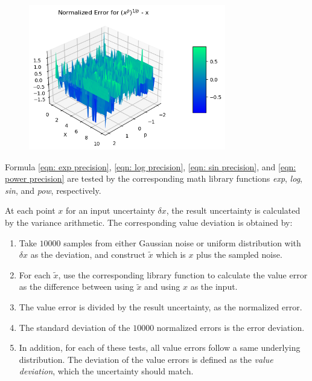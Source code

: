 \documentclass[twoside]{article}
\numberwithin{equation}{section}
\begin{document}
\begin{figure}[p]
\centering
\includegraphics[height=2.5in]{Power_Error.png} 
\label{fig: Power_Error}
\end{figure}


Formula \eqref{eqn: exp precision}, \eqref{eqn: log precision}, \eqref{eqn: sin precision}, and \eqref{eqn: power precision} are tested by the corresponding math library functions \textit{exp}, \textit{log}, \textit{sin}, and \textit{pow}, respectively.

At each point $x$ for an input uncertainty $\delta x$, the result uncertainty is calculated by the variance arithmetic.
The corresponding value deviation is obtained by:
\begin{enumerate}

\item Take $10000$ samples from either Gaussian noise or uniform distribution with $\delta x$ as the deviation, and construct $\tilde{x}$ which is $x$ plus the sampled noise.  

\item For each $\tilde{x}$, use the corresponding library function to calculate the value error as the difference between using $\tilde{x}$ and using $x$ as the input.

\item The value error is divided by the result uncertainty, as the normalized error.

\item The standard deviation of the $10000$ normalized errors is the error deviation.

\item In addition, for each of these tests, all value errors follow a same underlying distribution.
The deviation of the value errors is defined as the \emph{value deviation}, which the uncertainty should match.

\end{enumerate}
\end{document}
